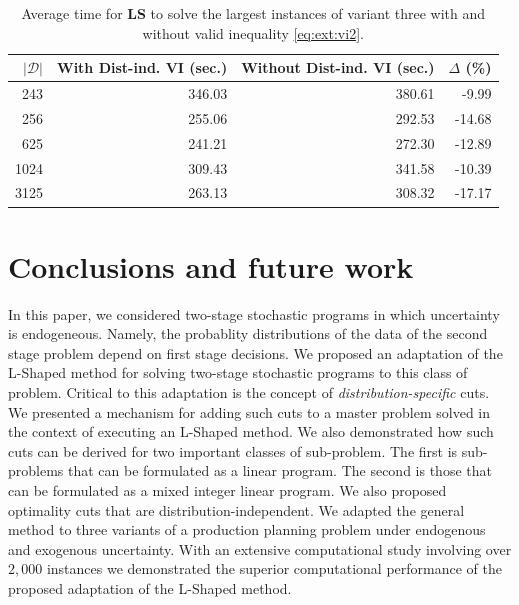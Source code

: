 \documentclass[12pt]{article}
\theoremstyle{thmstylethree}%
\newcommand{\mtc}[1] {\mathcal{#1}}
\begin{document}
\begin{table}[htp]

\caption{
Average time for \textbf{LS} to solve the largest instances of variant three with and without valid inequality \eqref{eq:ext:vi2}.
}\label{tab:max_ev_cuts}
  \centering  
    \begin{tabular}{rrrr}
    \toprule
  $\lvert\mtc{D}\rvert$ & With Dist-ind. VI (sec.) &  Without Dist-ind. VI (sec.) & $\Delta$ (\%) \\
\midrule
 243 & 346.03  & 380.61 & -9.99 \\
 256  & 255.06  & 292.53 & -14.68 \\
 625  & 241.21  & 272.30 & -12.89 \\
 1024  & 309.43  & 341.58 & -10.39 \\
 3125  & 263.13  & 308.32 & -17.17 \\
\bottomrule
\end{tabular}
\end{table}





\section{Conclusions and future work}
\label{sec:conclusion_future}

In this paper, we considered two-stage stochastic programs in which uncertainty is endogeneous.
Namely, the probablity distributions of the data of the second stage problem depend on first stage decisions.
We proposed an adaptation of the L-Shaped method for solving two-stage stochastic programs to this class of problem.
Critical to this adaptation is the concept of \textit{distribution-specific} cuts.
We presented a mechanism for adding such cuts to a master problem solved in the context of executing an L-Shaped method.
We also demonstrated how such cuts can be derived for two important classes of sub-problem.
The first is sub-problems that can be formulated as a linear program.
The second is those that can be formulated as a mixed integer linear program.
We also proposed optimality cuts that are distribution-independent. 
We adapted the general method to three variants of a production planning problem under endogenous and exogenous uncertainty.
With an extensive computational study involving over $2,000$ instances we demonstrated the superior computational performance of the proposed adaptation of the L-Shaped method. 
\end{document}
